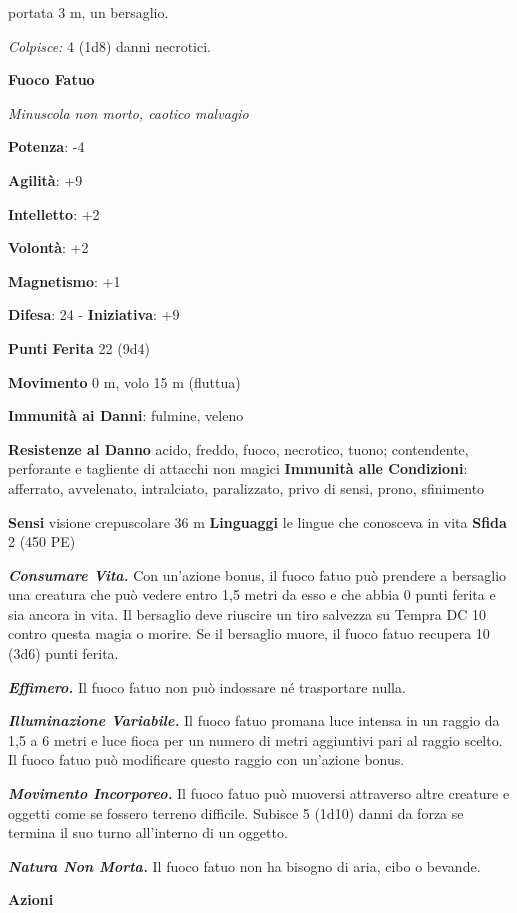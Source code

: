 \begin{multicols}{2}
portata 3 m, un bersaglio.

\emph{Colpisce:} 4 (1d8) danni necrotici.

\textbf{Fuoco Fatuo}

\emph{Minuscola non morto, caotico malvagio}

\textbf{Potenza}: -4

\textbf{Agilità}: +9

\textbf{Intelletto}: +2

\textbf{Volontà}: +2

\textbf{Magnetismo}: +1

\textbf{Difesa}: 24 - \textbf{Iniziativa}: +9

\textbf{Punti Ferita} 22 (9d4)

\textbf{Movimento} 0 m, volo 15 m (fluttua)

\textbf{Immunità ai Danni}: fulmine, veleno

\textbf{Resistenze al Danno} acido, freddo, fuoco, necrotico, tuono;
contendente, perforante e tagliente di attacchi non magici
\textbf{Immunità alle Condizioni}: afferrato, avvelenato, intralciato,
paralizzato, privo di sensi, prono, sfinimento

\textbf{Sensi} visione crepuscolare 36 m
\textbf{Linguaggi} le lingue che conosceva in vita \textbf{Sfida} 2 (450
PE)\smallskip

\emph{\textbf{Consumare Vita.}} Con un'azione bonus, il fuoco fatuo può
prendere a bersaglio una creatura che può vedere entro 1,5 metri da esso
e che abbia 0 punti ferita e sia ancora in vita. Il bersaglio deve
riuscire un tiro salvezza su Tempra DC 10 contro questa magia o
morire. Se il bersaglio muore, il fuoco fatuo recupera 10 (3d6) punti
ferita.

\emph{\textbf{Effimero.}} Il fuoco fatuo non può indossare né
trasportare nulla.

\emph{\textbf{Illuminazione Variabile.}} Il fuoco fatuo promana luce
intensa in un raggio da 1,5 a 6 metri e luce fioca per un numero di
metri aggiuntivi pari al raggio scelto. Il fuoco fatuo può modificare
questo raggio con un'azione bonus.

\emph{\textbf{Movimento Incorporeo.}} Il fuoco fatuo può muoversi
attraverso altre creature e oggetti come se fossero terreno difficile.
Subisce 5 (1d10) danni da forza se termina il suo turno all'interno di
un oggetto.

\emph{\textbf{Natura Non Morta.}} Il fuoco fatuo non ha bisogno di aria,
cibo o bevande.

\smallskip\textbf{Azioni}


\end{multicols}
